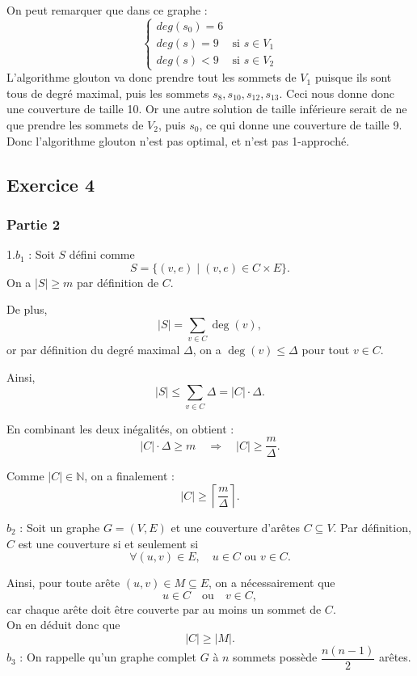 \documentclass{article}
\begin{document}
On peut remarquer que dans ce graphe : 
\begin{equation*}
    \begin{cases}
        deg(s_0) = 6 \\
        deg(s) = 9 & \text{si } s \in V_1 \\
        deg(s) < 9 & \text{si } s \in V_2
    \end{cases}
\end{equation*}
L'algorithme glouton va donc prendre tout les sommets de $V_1$ puisque ils sont tous de
degré maximal, puis les sommets $s_8, s_{10}, s_{12}, s_{13}$. Ceci nous donne donc 
une couverture de taille 10. Or une autre solution de taille inférieure serait de ne que prendre 
les sommets de $V_2$, puis $s_0$, ce qui donne une couverture de taille 9. Donc l'algorithme 
glouton n'est pas optimal, et n'est pas 1-approché.\\


\subsection{Exercice 4}

\subsubsection*{Partie 2}
1.$b_1$ : Soit $S$ défini comme 
\[
S = \{ (v,e) \mid (v,e) \in C \times E \}.
\]
On a $|S| \geq m$ par définition de $C$.

De plus,
\[
|S| = \sum_{v \in C} \deg(v),
\]
or par définition du degré maximal $\Delta$, on a $\deg(v) \leq \Delta$ pour tout $v \in C$.

Ainsi,
\[
|S| \leq \sum_{v \in C} \Delta = |C| \cdot \Delta.
\]

En combinant les deux inégalités, on obtient :
\[
|C| \cdot \Delta \geq m \quad \Rightarrow \quad |C| \geq \frac{m}{\Delta}.
\]

Comme $|C| \in \mathbb{N}$, on a finalement :
\[
|C| \geq \left\lceil \frac{m}{\Delta} \right\rceil.
\]

$b_2$ : Soit un graphe $G=(V,E)$ et une couverture d'arêtes $C \subseteq V$. Par définition, $C$ est une couverture si et seulement si 
\[
\forall (u,v) \in E, \quad u \in C \text{ ou } v \in C.
\]

Ainsi, pour toute arête $(u,v) \in M \subseteq E$, on a nécessairement que
\[
u \in C \quad \text{ou} \quad v \in C,
\]
car chaque arête doit être couverte par au moins un sommet de $C$. \\
On en déduit donc que
\[
|C| \ge |M|.
\]
$b_3$ : On rappelle qu'un graphe complet $G$ à $n$ sommets possède $\dfrac{n(n-1)}{2}$ arêtes.
\end{document}
